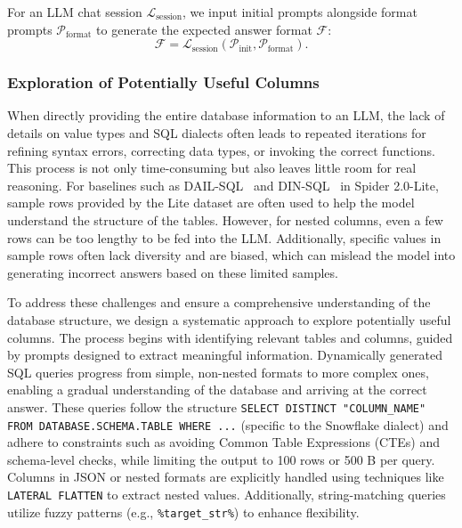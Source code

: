     For an LLM chat session $\mathcal{L}_{\text{session}}$, we input initial prompts alongside format prompts $\mathcal{P}_{\text{format}}$ to generate the expected answer format $\mathcal{F}$:  
    \begin{equation}
        \mathcal{F} = \mathcal{L}_{\text{session}}(\mathcal{P}_{\text{init}}, \mathcal{P}_{\text{format}}).
    \end{equation}

        
    \subsubsection{Exploration of Potentially Useful Columns} When directly providing the entire database information to an LLM, the lack of details on value types and SQL dialects often leads to repeated iterations for refining syntax errors, correcting data types, or invoking the correct functions. This process is not only time-consuming but also leaves little room for real reasoning. For baselines such as DAIL-SQL~\citep{gao2023text} and DIN-SQL~\citep{pourreza2024din} in Spider 2.0-Lite, sample rows provided by the Lite dataset are often used to help the model understand the structure of the tables. However, for nested columns, even a few rows can be too lengthy to be fed into the LLM. Additionally, specific values in sample rows often lack diversity and are biased, which can mislead the model into generating incorrect answers based on these limited samples.
        
    To address these challenges and ensure a comprehensive understanding of the database structure, we design a systematic approach to explore potentially useful columns. The process begins with identifying relevant tables and columns, guided by prompts designed to extract meaningful information. Dynamically generated SQL queries progress from simple, non-nested formats to more complex ones, enabling a gradual understanding of the database and arriving at the correct answer. These queries follow the structure \texttt{SELECT DISTINCT "COLUMN\_NAME" FROM DATABASE.SCHEMA.TABLE WHERE ...} (specific to the Snowflake dialect) and adhere to constraints such as avoiding Common Table Expressions (CTEs) and schema-level checks, while limiting the output to 100 rows or 500 B per query. Columns in JSON or nested formats are explicitly handled using techniques like \texttt{LATERAL FLATTEN} to extract nested values. Additionally, string-matching queries utilize fuzzy patterns (e.g., \texttt{\%target\_str\%}) to enhance flexibility.  
    
